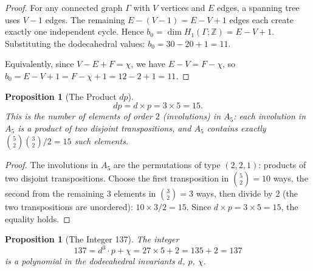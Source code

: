 \documentclass[11pt,a4paper]{article}
\theoremstyle{plain}
\newtheorem{proposition}[theorem]{Proposition}
\theoremstyle{definition}
\newcommand{\Z}{\mathbb{Z}}
\begin{document}
\begin{proof}
For any connected graph $\Gamma$ with $V$ vertices and $E$ edges, a
spanning tree uses $V - 1$ edges.  The remaining $E - (V - 1) = E - V + 1$
edges each create exactly one independent cycle.  Hence
$b_{0} = \dim H_{1}(\Gamma;\Z) = E - V + 1$.  Substituting the
dodecahedral values: $b_{0} = 30 - 20 + 1 = 11$.

Equivalently, since $V - E + F = \chi$, we have $E - V = F - \chi$, so
$b_{0} = E - V + 1 = F - \chi + 1 = 12 - 2 + 1 = 11$.
\end{proof}

\begin{proposition}[The Product $dp$]\label{prop:dp}
\begin{equation}\label{eq:dp}
  dp = d \times p = 3 \times 5 = 15.
\end{equation}
This is the number of elements of order $2$ (involutions) in $A_{5}$:
each involution in $A_{5}$ is a product of two disjoint transpositions,
and $A_{5}$ contains exactly $\binom{5}{2}\binom{3}{2}/2 = 15$ such
elements.
\end{proposition}

\begin{proof}
The involutions in $A_{5}$ are the permutations of type $(2,2,1)$:
products of two disjoint transpositions.  Choose the first transposition
in $\binom{5}{2} = 10$ ways, the second from the remaining $3$ elements
in $\binom{3}{2} = 3$ ways, then divide by $2$ (the two transpositions
are unordered): $10 \times 3 / 2 = 15$.  Since $d \times p = 3 \times 5
= 15$, the equality holds.
\end{proof}

\begin{proposition}[The Integer 137]\label{prop:137}
The integer
\begin{equation}\label{eq:137}
  137 = d^{3} \cdot p + \chi = 27 \times 5 + 2 = 135 + 2 = 137
\end{equation}
is a polynomial in the dodecahedral invariants $d$, $p$, $\chi$.
\end{proposition}
\end{document}
